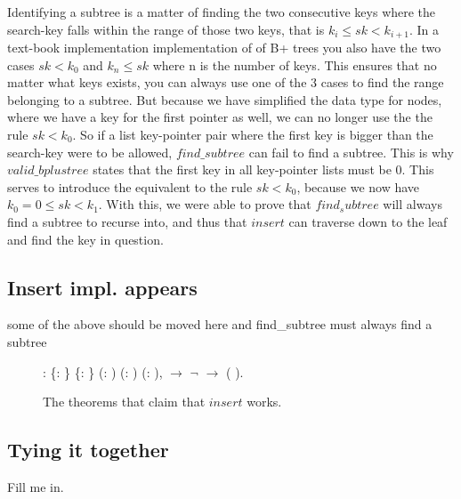 Identifying a subtree is a matter of finding the two consecutive keys where the search-key falls within the range of those two keys, that is $k_i \le sk < k_{i+1}$. In a text-book implementation implementation of of B+ trees you also have the two cases $sk < k_0$ and $k_{n} \le sk$ where n is the number of keys. This ensures that no matter what keys exists, you can always use one of the 3 cases to find the range belonging to a subtree. But because we have simplified the data type for nodes, where we have a key for the first pointer as well, we can no longer use the the rule $sk < k_0$. So if a list key-pointer pair where the first key is bigger than the search-key were to be allowed, $find\_subtree$ can fail to find a subtree. This is why $valid\_bplustree$ states that the first key in all key-pointer lists must be 0. This serves to introduce the equivalent to the rule $sk < k_0$, because we now have $k_0 = 0 \le sk < k_1$. With this, we were able to prove that $find_subtree$ will always find a subtree to recurse into, and thus that $insert$ can traverse down to the leaf and find the key in question.

\subsection{Insert impl. appears}
some of the above should be moved here and find\_subtree must always find a subtree

\begin{figure}
  \begin{coqdoccode}
  \coqdocnoindent
    : \coqdockw{\ensuremath{\forall}} \{: \} \{: \} (:   ) (: ) (: ),\coqdoceol
  \coqdocindent{1.00em}
      \ensuremath{\rightarrow} \coqdoceol
  \coqdocindent{1.00em}
  \ensuremath{\lnot}   \ensuremath{\rightarrow} \coqdoceol
  \coqdocindent{1.00em}
    (   ).\coqdoceol
  \end{coqdoccode}
  \caption{The theorems that claim that $insert$ works.}
  \label{fig:insert_works}
\end{figure}

\subsection{Tying it together}
Fill me in.

